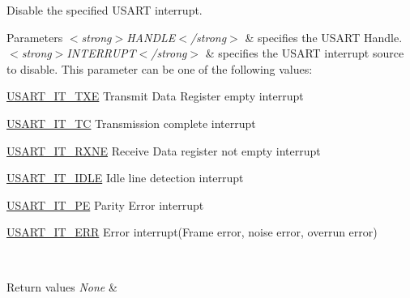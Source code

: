 Disable the specified U\+S\+A\+RT interrupt. 


\begin{DoxyParams}{Parameters}
{\em $<$strong$>$\+H\+A\+N\+D\+L\+E$<$/strong$>$} & specifies the U\+S\+A\+RT Handle. \\
\hline
{\em $<$strong$>$\+I\+N\+T\+E\+R\+R\+U\+P\+T$<$/strong$>$} & specifies the U\+S\+A\+RT interrupt source to disable. This parameter can be one of the following values\+: \begin{DoxyItemize}
\item \hyperlink{group___u_s_a_r_t___interrupt__definition_gab18d0fe889204a4c34f6d5817fb5147d}{U\+S\+A\+R\+T\+\_\+\+I\+T\+\_\+\+T\+XE} Transmit Data Register empty interrupt \item \hyperlink{group___u_s_a_r_t___interrupt__definition_ga748e86162cc110513330079982821c39}{U\+S\+A\+R\+T\+\_\+\+I\+T\+\_\+\+TC} Transmission complete interrupt \item \hyperlink{group___u_s_a_r_t___interrupt__definition_gacdd49b93072655a21a63a35e6431f8ae}{U\+S\+A\+R\+T\+\_\+\+I\+T\+\_\+\+R\+X\+NE} Receive Data register not empty interrupt \item \hyperlink{group___u_s_a_r_t___interrupt__definition_ga5d85aab24b7b2dfddb61ba2a49fa6185}{U\+S\+A\+R\+T\+\_\+\+I\+T\+\_\+\+I\+D\+LE} Idle line detection interrupt \item \hyperlink{group___u_s_a_r_t___interrupt__definition_gae607c28a462c224c575b7541dc4f7067}{U\+S\+A\+R\+T\+\_\+\+I\+T\+\_\+\+PE} Parity Error interrupt \item \hyperlink{group___u_s_a_r_t___interrupt__definition_ga631e83efd4c4789128d80a9539faf78a}{U\+S\+A\+R\+T\+\_\+\+I\+T\+\_\+\+E\+RR} Error interrupt(\+Frame error, noise error, overrun error) \end{DoxyItemize}
\\
\hline
\end{DoxyParams}

\begin{DoxyRetVals}{Return values}
{\em None} & \\
\hline
\end{DoxyRetVals}
\mbox{\label{group___u_s_a_r_t___exported___macros_ga60e106d6d610ea5fa1ab2d5ca079a8cf}} 
